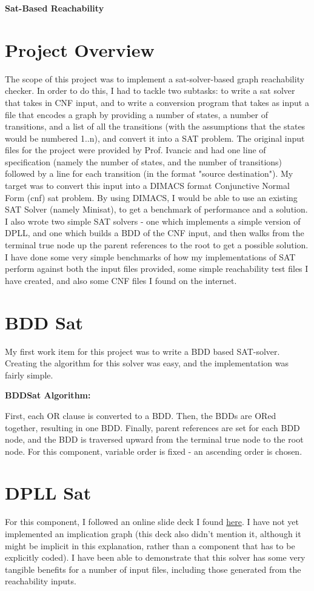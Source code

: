 \documentclass[11pt]{article}
\begin{document}
\begin{center}
\huge{\bf{Sat-Based Reachability}}
\end{center}
\begin{flushleft}
\section{Project Overview} The scope of this project was to implement a sat-solver-based graph reachability checker. In order to do this, I had to tackle two subtasks: to write a sat solver that takes in CNF input, and to write a conversion program that takes as input a file that encodes a graph by providing a number of states, a number of transitions, and a list of all the transitions (with the assumptions that the states would be numbered 1..n), and convert it into a SAT problem. The original input files for the project were provided by Prof. Ivancic and had one line of specification (namely the number of states, and the number of transitions) followed by a line for each transition (in the format "source destination"). My target was to convert this input into a DIMACS format Conjunctive Normal Form (cnf) sat problem. By using DIMACS, I would be able to use an existing SAT Solver (namely Minisat), to get a benchmark of performance and a solution. I also wrote two simple SAT solvers - one which  implements a simple version of DPLL, and one which builds a BDD of the CNF input, and then walks from the terminal true node up the parent references to the root to get a possible solution. I have done some very simple benchmarks of how my implementations of SAT perform against both the input files provided, some simple reachability test files I have created, and also some CNF files I found on the internet.
\section{BDD Sat}
My first work item for this project was to write a BDD based SAT-solver. Creating the algorithm for this solver was easy, and the implementation was fairly simple.\bigskip

{\bf{BDDSat Algorithm:}}\medskip

First, each OR clause is converted to a BDD. Then, the BDDs are ORed together, resulting in one BDD. Finally,  parent references are set for each BDD node, and the BDD is traversed upward from the terminal true node to the root node. For this component, variable order is fixed - an ascending order is chosen.

\section{DPLL Sat} For this component, I followed an online slide deck I found \href{http://profs.sci.univr.it/~farinelli/courses/ar/slides/DPLL.pdf}{here}. I have not yet implemented an implication graph (this deck also didn't mention it, although it might be implicit in this explanation, rather than a component that has to be explicitly coded). I have been able to demonstrate that this solver has some very tangible benefits for a number of input files, including those generated from the reachability inputs.\bigskip


\end{flushleft}
\end{document}

